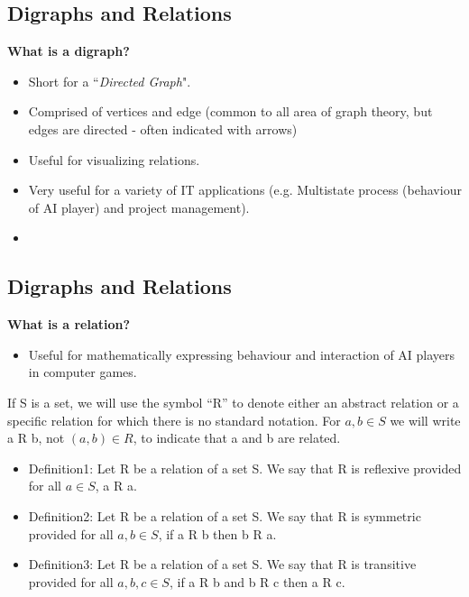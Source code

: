 \documentclass[]{report}
\begin{document}


\subsection{Digraphs and Relations}
\textbf{What is a digraph?}
\begin{itemize}
\item Short for a ``\textit{Directed Graph}".
\item Comprised of vertices and edge (common to all area of graph theory, but edges are directed - often indicated with arrows)
\item Useful for visualizing relations.
\item Very useful for a variety of IT applications (e.g. Multistate process (behaviour of AI player) and project management).
\item 
\end{itemize}




\subsection{Digraphs and Relations}

\textbf{What is a relation?}
\begin{itemize}

\item Useful for mathematically expressing behaviour and interaction of AI players in computer games.
\end{itemize}

%

If S is a set, we will use the symbol “R” to denote either an abstract relation or a specific
relation for which there is no standard notation. For $a, b \in S$ we will write a R b, not
$(a, b) \in R$, to indicate that a and b are related.

\begin{itemize}
\item Definition1: Let R be a relation of a set S. We say that R is reflexive provided for all
$a \in S$, a R a.

\item Definition2: Let R be a relation of a set S. We say that R is symmetric provided for
all $a, b \in S$, if a R b then b R a.

\item Definition3: Let R be a relation of a set S. We say that R is transitive provided for
all $a, b,c \in S$, if a R b and b R c then a R c.
\end{itemize}
\end{document}
